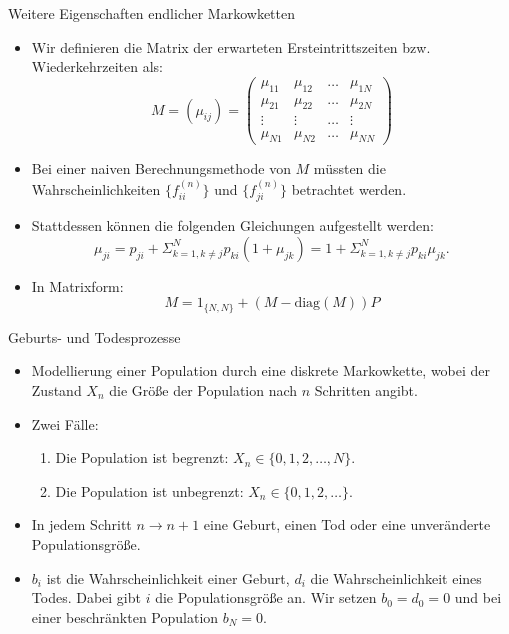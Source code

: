 \documentclass{beamer}
\begin{document}
\begin{frame}{Weitere Eigenschaften endlicher Markowketten}
  \begin{itemize}
  \item Wir definieren die Matrix der erwarteten Ersteintrittszeiten bzw{.} Wiederkehrzeiten als:
    \[
      M = (μ_{ij}) = \begin{pmatrix}
        μ_{11} & μ_{12} & \dots & μ_{1N} \\
        μ_{21} & μ_{22} & \dots & μ_{2N} \\
        \vdots & \vdots & \dots & \vdots \\
        μ_{N1} & μ_{N2} & \dots & μ_{NN}
      \end{pmatrix}
    \]
  \item Bei einer naiven Berechnungsmethode von $M$ müssten die Wahrscheinlichkeiten $\{f_{ii}^{(n)}\}$ und $\{f_{ji}^{(n)}\}$ betrachtet werden.
  \item Stattdessen können die folgenden Gleichungen aufgestellt werden:
    \[
      μ_{ji} = p_{ji} + Σ_{k=1,k≠j}^Np_{ki}(1+μ_{jk}) = 1+Σ_{k=1,k≠j}^Np_{ki}μ_{jk}.
    \]
  \item In Matrixform:
    \[
      M = 1_{\{N,N\}} + (M - \text{diag}(M))P
    \]
  \end{itemize}
\end{frame}
\begin{frame}{Geburts- und Todesprozesse}
  \begin{itemize}
  \item Modellierung einer Population durch eine diskrete Markowkette, wobei der Zustand $X_n$ die Größe der Population nach $n$ Schritten angibt.
  \item Zwei Fälle:
    \begin{enumerate}
    \item Die Population ist begrenzt: $X_n \in \{0,1,2,\dots,N\}$.
    \item Die Population ist unbegrenzt: $X_n \in \{0,1,2,\dots\}$.
    \end{enumerate}
  \item In jedem Schritt $n → n+1$ eine Geburt, einen Tod oder eine unveränderte Populationsgröße.
  \item $b_i$ ist die Wahrscheinlichkeit einer Geburt, $d_i$ die Wahrscheinlichkeit eines Todes. Dabei gibt $i$ die Populationsgröße an. Wir setzen $b_0 = d_0 = 0$ und bei einer beschränkten Population $b_N = 0$.
  \end{itemize}
\end{frame}
\end{document}

